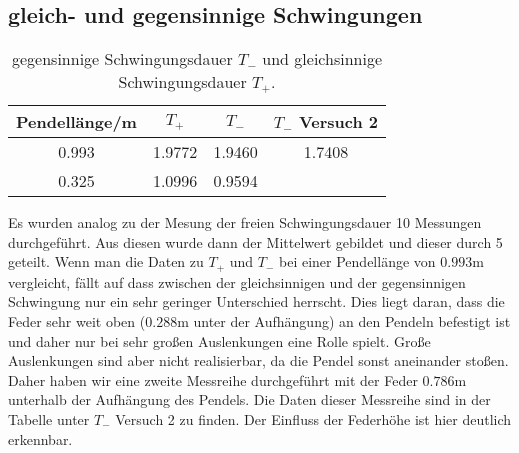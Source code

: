   \subsection{gleich- und gegensinnige Schwingungen}
    \begin{table}
      \centering
        \caption{gegensinnige Schwingungsdauer $T_{-}$ und gleichsinnige Schwingungsdauer $T_{+}$.}
        \label{tab:aufgabe23}
        \begin{tabular}{S S S S}
          \toprule
          {Pendellänge/m} & {$T_{+}$} & {$T_{-}$} & {$T_{-}$ Versuch 2}\\
                     & 1.9772    & 1.9460   & 1.7408 \\
          0.325           & 1.0996   & 0.9594    &         \\
          \bottomrule
        \end{tabular}
    \end{table}
    Es wurden analog zu der Mesung der freien Schwingungsdauer 10 Messungen durchgeführt. Aus diesen wurde dann der Mittelwert
    gebildet und dieser durch 5 geteilt. Wenn man die Daten zu $T_{+}$ und $T_{-}$ bei einer Pendellänge von $0.993$m vergleicht,
    fällt auf dass zwischen der gleichsinnigen und der gegensinnigen Schwingung nur ein sehr geringer Unterschied herrscht. Dies
    liegt daran, dass die Feder sehr weit oben ($0.288$m unter der Aufhängung) an den Pendeln befestigt ist und daher nur bei
    sehr großen Auslenkungen eine Rolle spielt. Große Auslenkungen sind aber nicht realisierbar, da die Pendel sonst aneinander
    stoßen. Daher haben wir eine zweite Messreihe durchgeführt mit der Feder $0.786$m unterhalb der Aufhängung des Pendels. Die
    Daten dieser Messreihe sind in der Tabelle unter $T_{-}$ Versuch 2 zu finden. Der Einfluss der Federhöhe ist hier deutlich
    erkennbar.
